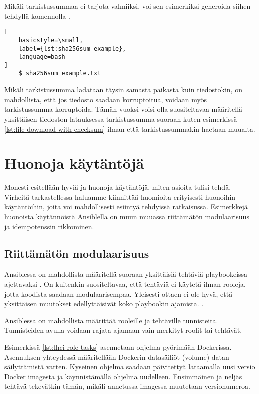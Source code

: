 

Mikäli tarkistussummaa ei tarjota valmiiksi, voi sen esimerkiksi generoida siihen tehdyllä
komennolla \parencite{Sha256sumManPage}.

\begin{lstlisting}[
    basicstyle=\small,
    label={lst:sha256sum-example},
    language=bash
]
    $ sha256sum example.txt
\end{lstlisting}

Mikäli tarkistussumma ladataan täysin samasta paikasta kuin tiedostokin, on mahdollista, että
jos tiedosto saadaan korruptoitua, voidaan myös tarkistussumma korruptoida. Tämän vuoksi voisi
olla suositeltavaa määritellä yksittäisen tiedoston latauksessa tarkistussumma suoraan kuten
esimerkissä \ref{lst:file-download-with-checksum} ilman että tarkistussummakin haetaan muualta.

\section{Huonoja käytäntöjä}

Monesti esitellään hyviä ja huonoja käytäntöjä, miten asioita tulisi tehdä. Virheitä
tarkastellessa haluamme kiinnittää huomioita erityisesti huonoihin käytäntöihin, joita
voi mahdollisesti esiintyä tehdyissä ratkaisussa. Esimerkkejä huonoista käytännöistä
Ansiblella on muun muuassa riittämätön modulaarisuus ja idempotenssin rikkominen.

\subsection{Riittämätön modulaarisuus}

Ansiblessa on mahdollista määritellä suoraan yksittäisiä tehtäviä playbookeissa ajettavaksi
\parencite{AnsibleDocs}. On kuitenkin suositeltavaa, että tehtäviä ei käytetä ilman rooleja,
jotta koodista saadaan modulaarisempaa. Yleisesti ottaen ei ole hyvä, että yksittäisen
muutokset edellyttäisivät koko playbookin ajamista. \parencite{KumaraIndika2021Tdad}.

Ansiblessa on mahdollista määrittää rooleille ja tehtäville tunnisteita. Tunnisteiden
avulla voidaan rajata ajamaan vain merkityt roolit tai tehtävät. \parencite{AnsibleDocs}

Esimerkissä \ref{lst:lhci-role-tasks} asennetaan ohjelma pyörimään Dockerissa. Asennuksen
yhteydessä määritellään Dockerin datasäiliöt (volume) datan säilyttämistä varten. Kyseinen
ohjelma saadaan päivitettyä lataamalla uusi versio Docker imagesta ja käynnistämällä ohjelma
uudelleen. Ensimmäinen ja neljäs tehtävä tekevätkin tämän, mikäli annetussa imagessa muutetaan
versionumeroa.

